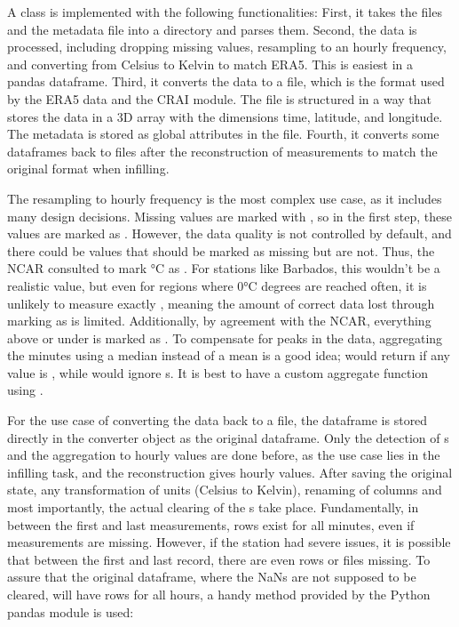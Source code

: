 A class  is implemented with the following functionalities:
First, it takes the  files and the metadata file into a directory and parses them. 
Second, the data is processed, including dropping missing values, resampling to an hourly frequency, and converting from Celsius to Kelvin to match ERA5. 
This is easiest in a pandas dataframe. 
Third, it converts the data to a  file, which is the format used by the ERA5 data and the CRAI module. 
The  file is structured in a way that stores the data in a 3D array with the dimensions time, latitude, and longitude. 
The metadata is stored as global attributes in the  file. 
Fourth, it converts some dataframes back to  files after the reconstruction of measurements to match the original format when infilling.

The resampling to hourly frequency is the most complex use case, as it includes many design decisions.
Missing values are marked with , so in the first step, these values are marked as .
However, the data quality is not controlled by default, and there could be values that should be marked as missing but are not.
Thus, the NCAR consulted to mark  °C as .
For stations like Barbados, this wouldn't be a realistic value, but even for regions where 0°C degrees are reached often, it is unlikely to measure exactly , meaning the amount of correct data lost through marking  as  is limited.
Additionally, by agreement with the NCAR, everything above or under  is marked as .
To compensate for peaks in the data, aggregating the minutes using a median instead of a mean is a good idea;  would return  if any value is , while  would ignore s.
It is best to have a custom aggregate function using .

For the use case of converting the data back to a  file, the dataframe is stored directly in the converter object as the original dataframe. Only the detection of s and the aggregation to hourly values are done before, as the use case lies in the infilling task, and the reconstruction gives hourly values.
After saving the original state, any transformation of units (Celsius to Kelvin), renaming of columns and most importantly, the actual clearing of the s take place.
Fundamentally, in between the first and last measurements, rows exist for all minutes, even if measurements are missing.
However, if the station had severe issues, it is possible that between the first and last record, there are even rows or files missing.
To assure that the original dataframe, where the NaNs are not supposed to be cleared, will have rows for all hours, a handy method provided by the Python pandas module is used:

